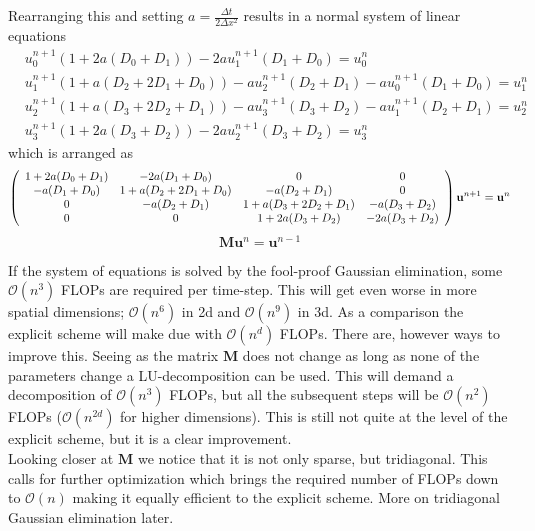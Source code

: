 Rearranging this and setting $a = \frac{\Delta t}{2\Delta x^2}$ results in a normal system of linear equations
\begin{align*}
 &u^{n+1}_0\left(1+2a(D_0+D_1)\right)- 2au^{n+1}_{1}(D_1+D_0) =  u^n_0\\
 &u^{n+1}_1\left(1+a(D_2+2D_1+D_0)\right)-au^{n+1}_{2}(D_2+D_1)-au^{n+1}_{0}(D_1+D_0) = u^n_1\\
 &u^{n+1}_2\left(1+a(D_3+2D_2+D_1)\right)-au^{n+1}_{3}(D_3+D_2)-au^{n+1}_{1}(D_2+D_1) = u^n_2\\
 &u^{n+1}_3\left(1+2a(D_3+D_2)\right)- 2au^{n+1}_{2}(D_3+D_2) =  u^n_3
\end{align*}
which is arranged as 
{\scriptsize
\begin{align}\label{BE}
 \left(\begin{array}{c c c c}
        1+2a(D_0+D_1) & -2a(D_1+D_0) &0 &0 \\
        -a(D_1+D_0) &1+a(D_2+2D_1+D_0) & -a(D_2+D_1) &0 \\
        0& -a(D_2+D_1) & 1+a(D_3+2D_2+D_1)& -a(D_3+D_2)\\
        0& 0& 1+2a(D_3+D_2) & - 2a(D_3+D_2)\\
       \end{array}\right)\mathbf{u}^{n+1} = \mathbf{u}^{n}
\end{align}
}
\begin{equation}
  \mathbf{M}\mathbf{u}^n = \mathbf{u}^{n-1}
\end{equation}


If the system of equations is solved by the fool-proof Gaussian elimination, some $\mathcal O(n^3)$ FLOPs are required per time-step. This will get even worse in more spatial dimensions; $\mathcal O(n^6)$ in 2d and $\mathcal O(n^9)$ in 3d. 
As a comparison the explicit scheme will make due with $\mathcal O(n^d)$ FLOPs.
There are, however ways to improve this. Seeing as the matrix $\mathbf M$ does not change as long as none of the parameters change a LU-decomposition can be used. 
This will demand a decomposition of $\mathcal{O}(n^3)$ FLOPs, but all the subsequent steps will be $\mathcal{O}(n^2)$ FLOPs ($\mathcal O(n^{2d})$ for higher dimensions). 
This is still not quite at the level of the explicit scheme, but it is a clear improvement. \\
Looking closer at $\mathbf M$ we notice that it is not only sparse, but tridiagonal. This calls for further optimization which brings the required number of FLOPs down to $\mathcal O(n)$ making it equally efficient to the explicit scheme. More on tridiagonal Gaussian elimination later.


